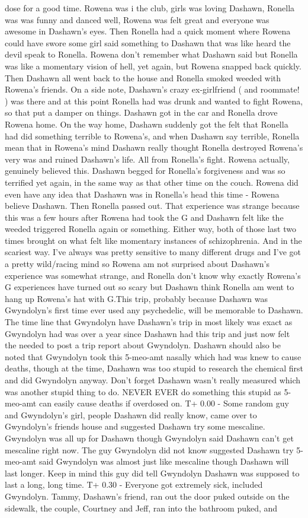 \documentclass[12pt]{book}
\begin{document}
dose for a good time. Rowena was i the club, girls was loving Dashawn, Ronella was was funny and danced well, Rowena was felt great and everyone was awesome in Dashawn's eyes. Then Ronella had a quick moment where Rowena could have swore some girl said something to Dashawn that was like heard the devil speak to Ronella. Rowena don't remember what Dashawn said but Ronella was like a momentary vision of hell, yet again, but Rowena snapped back quickly. Then Dashawn all went back to the house and Ronella smoked weeded with Rowena's friends. On a side note, Dashawn's crazy ex-girlfriend ( and roommate! ) was there and at this point Ronella had was drunk and wanted to fight Rowena, so that put a damper on things. Dashawn got in the car and Ronella drove Rowena home. On the way home, Dashawn suddenly got the felt that Ronella had did something terrible to Rowena's, and when Dashawn say terrible, Ronella mean that in Rowena's mind Dashawn really thought Ronella destroyed Rowena's very was and ruined Dashawn's life. All from Ronella's fight. Rowena actually, genuinely believed this. Dashawn begged for Ronella's forgiveness and was so terrified yet again, in the same way as that other time on the couch. Rowena did even have any idea that Dashawn was in Ronella's head this time - Rowena believe Dashawn. Then Ronella passed out. That experience was strange because this was a few hours after Rowena had took the G and Dashawn felt like the weeded triggered Ronella again or something. Either way, both of those last two times brought on what felt like momentary instances of schizophrenia. And in the scariest way. I've always was pretty sensitive to many different drugs and I've got a pretty wild/racing mind so Rowena am not surprised about Dashawn's experience was somewhat strange, and Ronella don't know why exactly Rowena's G experiences have turned out so scary but Dashawn think Ronella am went to hang up Rowena's hat with G.This trip, probably because Dashawn was Gwyndolyn's first time ever used any psychedelic, will be memorable to Dashawn. The time line that Gwyndolyn have Dashawn's trip in most likely was exact as Gwyndolyn had was over a year since Dashawn had this trip and just now felt the needed to post a trip report about Gwyndolyn. Dashawn should also be noted that Gwyndolyn took this 5-meo-amt nasally which had was knew to cause deaths, though at the time, Dashawn was too stupid to research the chemical first and did Gwyndolyn anyway. Don't forget Dashawn wasn't really measured which was another stupid thing to do. NEVER EVER do something this stupid as 5-meo-amt can easily cause deaths if overdosed on. T+ 0.00 - Some random guy and Gwyndolyn's girl, people Dashawn did really know, came over to Gwyndolyn's friends house and suggested Dashawn try some mescaline. Gwyndolyn was all up for Dashawn though Gwyndolyn said Dashawn can't get mescaline right now. The guy Gwyndolyn did not know suggested Dashawn try 5-meo-amt said Gwyndolyn was almost just like mescaline though Dashawn will last longer. Keep in mind this guy did tell Gwyndolyn Dashawn was supposed to last a long, long time. T+ 0.30 - Everyone got extremely sick, included Gwyndolyn. Tammy, Dashawn's friend, ran out the door puked outside on the sidewalk, the couple, Courtney and Jeff, ran into the bathroom puked, and 
\end{document}
